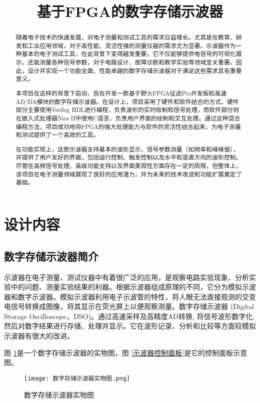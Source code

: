 \documentclass[lang=cn,a4paper,newtx]{elegantpaper}
\title{基于FPGA的数字存储示波器}
\begin{document}
\maketitle

\begin{abstract}
随着电子技术的快速发展，对电子测量和测试工具的需求日益增长。尤其是在教育、研发和工业应用领域，对于高性能、灵活性强的测量仪器的需求尤为显著。示波器作为一种基本的电子测试工具，在此背景下变得越发重要。它不仅能够提供电信号的可视化展示，还能测量各种信号参数，对于电路设计、故障诊断和教学实验等领域至关重要。因此，设计并实现一个功能全面、性能卓越的数字存储示波器对于满足这些需求具有重要意义。

本项目在这样的背景下启动，旨在开发一款基于野火FPGA征途Pro开发板和高速AD/DA模块的数字存储示波器。在设计上，项目采用了硬件和软件结合的方式，硬件部分主要使用Verilog HDL进行编程，负责波形的实时绘制和信号处理，而软件部分则在嵌入式处理器Nios II中使用C语言，负责用户界面的绘制和交互处理。通过这种混合编程方法，项目成功地将FPGA的强大处理能力与软件的灵活性结合起来，为电子测量和测试提供了一个高效的工具。

在功能实现上，这款示波器支持基本的波形显示、信号参数测量（如频率和峰峰值），并提供了用户友好的界面，包括运行控制、触发控制以及水平和竖直方向的波形控制。尽管在高频信号处理、高级功能支持以及界面美观性方面存在一定的局限，但整体上，该项目在电子测量领域展现了良好的应用潜力，并为未来的技术改进和功能扩展奠定了基础。
\end{abstract}
	
\section{设计内容}
\subsection{数字存储示波器简介 }
示波器在电子测量、测试仪器中有着很广泛的应用，是观察电路实验现象、分析实验中的问题、测量实验结果的利器。根据示波器组成原理的不同，它分为模拟示波器和数字示波器。模拟示波器利用电子示波管的特性，将人眼无法直接观测的交变电信号转换成图像，将其显示在荧光屏上以便观察测量。数字存储示波器 (Digital Storage Oscilloscope，DSO)。通过高速采样及高精度AD转换, 将信号波形数字化, 然后对数字结果进行存储、处理并显示。它在波形记录、分析和比较等方面较模拟示波器有很大的改进。 

图 \ref{数字存储示波器实物图}是一个数字存储示波器的实物图，图 \ref{示波器控制面板}是它的控制面板示意图。
 \begin{figure}[!htb]
 	\centering
 	\caption{数字存储示波器实物图}
 	\label{数字存储示波器实物图}
 	\texttt{[image: 数字存储示波器实物图.png]}
 \end{figure}
 
\end{document}
